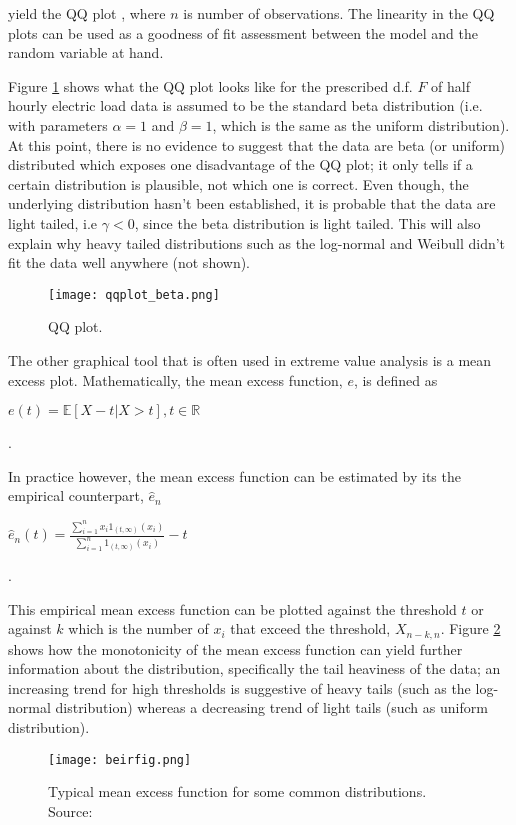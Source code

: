 \noindent yield the QQ plot \citep[ch.~6]{embrechts}, where $n$ is number of observations. The linearity in the QQ plots can be used as a goodness of fit assessment between the model and the random variable at hand.

Figure \ref{fig:beta} shows what the QQ plot looks like for the prescribed d.f. $F$ of half hourly electric load data is assumed to be the standard beta distribution (i.e. with parameters $\alpha=1$ and $\beta=1$, which is the same as the uniform distribution). At this point, there is no evidence to suggest that the data are beta (or uniform) distributed  which exposes one disadvantage of the QQ plot; it only tells if a certain distribution is plausible, not which one is correct. Even though, the underlying distribution hasn't been established, it is probable that the data are light tailed, i.e $\gamma < 0$, since the beta distribution is light tailed. This will also explain why heavy tailed distributions such as the log-normal and Weibull didn't fit the data well anywhere (not shown). 

\begin{figure}
\centering
\texttt{[image: qqplot\_beta.png]}
\caption{\label{fig:beta} QQ plot.}
\end{figure}

The other graphical tool that is often used in extreme value analysis is a mean excess plot. Mathematically, the mean excess function, $e$,  is defined as

\centerline{$e(t) = \mathbb{E}[X-t | X>t], t \in \mathbb{R}$}.
 
In practice however, the mean excess function can be estimated by its the empirical counterpart, $\hat{e}_n$ \citep[ch.~1]{beirlant}

\centerline{$\hat{e}_n(t) = \frac{\sum\limits_{i=1}^n x_i 1_{(t,\infty)}(x_i)}{\sum\limits_{i=1}^n 1_{(t,\infty)}(x_i)} - t$}.

This empirical mean excess function can be plotted against the threshold $t$ or against $k$ which is the number of $x_i$ that exceed the threshold, $X_{n-k,n}$. Figure \ref{fig:beir} shows how the monotonicity of the mean excess function can yield further information about the distribution, specifically the tail heaviness of the data; an increasing trend for high thresholds is suggestive of heavy tails (such as the log-normal distribution) whereas a decreasing trend of light tails (such as uniform distribution).

\begin{figure}
\centering
\texttt{[image: beirfig.png]}
\caption{Typical mean excess function for some common distributions. Source: \cite{beirlant}}
\label{fig:beir} 
\end{figure}

